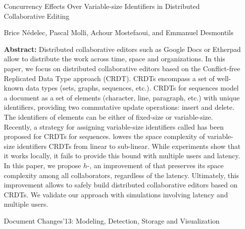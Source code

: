 \begin{itemize}
\item [Concurrency Effects Over Variable-size Identifiers in Distributed 
  Collaborative Editing]
\item [Brice Nédelec, Pascal Molli, Achour Mostefaoui, and Emmanuel Desmontils]
\item [\textbf{Abstract:}] Distributed collaborative editors such as Google Docs
  or Etherpad allow to distribute the work across time, space and
  organizations. In this paper, we focus on distributed collaborative editors
  based on the Conflict-free Replicated Data Type approach (CRDT). CRDTs
  encompass a set of well-known data types (sets, graphs, sequences,
  etc.). CRDTs for sequences model a document as a set of elements (character,
  line, paragraph, etc.) with unique identifiers, providing two commutative
  update operations: insert and delete. The identifiers of elements can be
  either of fixed-size or variable-size. Recently, a strategy for assigning
  variable-size identifiers called \LSEQ has been proposed for CRDTs for
  sequences. \LSEQ lowers the space complexity of variable-size identifiers
  CRDTs from linear to sub-linear. While experiments show that it works locally,
  it fails to provide this bound with multiple users and latency. In this paper,
  we propose $h$-\LSEQ, an improvement of \LSEQ that preserves its space
  complexity among all collaborators, regardless of the latency. Ultimately,
  this improvement allows to safely build distributed collaborative editors
  based on CRDTs. We validate our approach with simulations involving latency
  and multiple users.
\item [Document Changes'13: Modeling, Detection, Storage and Visualization]
\end{itemize}